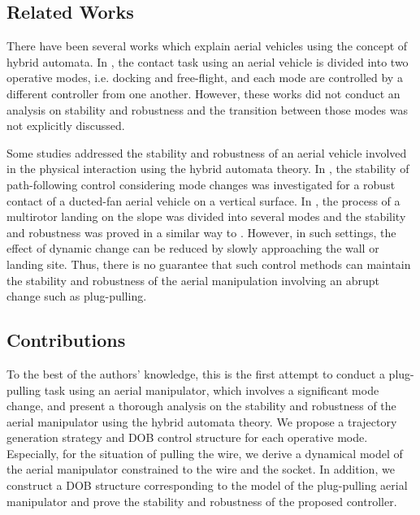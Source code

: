 \documentclass[letterpaper, 10 pt, conference]{ieeeconf}  %
\theoremstyle{definition}
\begin{document}
\subsection{Related Works}
There have been several works which explain aerial vehicles using the concept of hybrid automata. In \cite{scholten2013interaction, darivianakis2014hybrid, Praveen2020inspection}, the contact task using an aerial vehicle is divided into two operative modes, i.e. docking and free-flight, and each mode are controlled by a different controller from one another. %
However, these works did not conduct an analysis on stability and robustness and the transition between those modes was not explicitly discussed. 

Some studies addressed the stability and robustness of an aerial vehicle involved in the physical interaction using the hybrid automata theory. In \cite{marconi2012control}, the stability of path-following control considering mode changes was investigated for a robust contact of a ducted-fan aerial vehicle on a vertical surface. In \cite{Cabecinhas2016robust}, the process of a multirotor landing on the slope was divided into several modes and the stability and robustness was proved in a similar way to \cite{marconi2012control}. However, in such settings, the effect of dynamic change can be reduced by slowly approaching the wall or landing site. Thus, there is no guarantee that such control methods can maintain the stability and robustness of the aerial manipulation involving an abrupt change such as plug-pulling. %

\subsection{Contributions}
To the best of the authors' knowledge, this is the first attempt to conduct a plug-pulling task using an aerial manipulator, which involves a significant mode change, and present a thorough analysis on the stability and robustness of the aerial manipulator using the hybrid automata theory. We propose a trajectory generation strategy and DOB control structure for each operative mode. Especially, for the situation of pulling the wire, we derive a dynamical model of the aerial manipulator constrained to the wire and the socket. In addition, we construct a DOB structure corresponding to the model of the plug-pulling aerial manipulator and prove the stability and robustness of the proposed controller.
\end{document}
